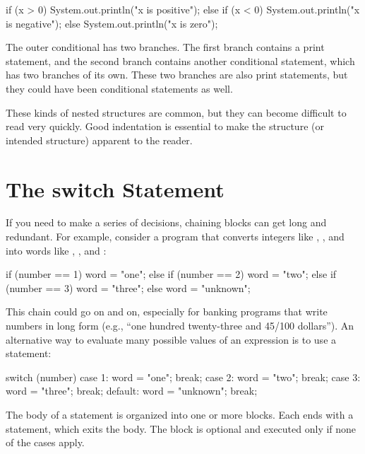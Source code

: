 \begin{code}
if (x > 0) {
    System.out.println("x is positive");
} else {
    if (x < 0) {
        System.out.println("x is negative");
    } else {
        System.out.println("x is zero");
    }
}
\end{code}

The outer conditional has two branches.
The first branch contains a print statement, and the second branch contains another conditional statement, which has two branches of its own.
These two branches are also print statements, but they could have been conditional statements as well.


These kinds of nested structures are common, but they can become difficult to read very quickly.
Good indentation is essential to make the structure (or intended structure) apparent to the reader.


\section{The switch Statement}

If you need to make a series of decisions, chaining  blocks can get long and redundant.
For example, consider a program that converts integers like , , and  into words like , , and :

\begin{code}
if (number == 1) {
    word = "one";
} else if (number == 2) {
    word = "two";
} else if (number == 3) {
    word = "three";
} else {
    word = "unknown";
}
\end{code}


This chain could go on and on, especially for banking programs that write numbers in long form (e.g., ``one hundred twenty-three and 45/100 dollars'').
An alternative way to evaluate many possible values of an expression is to use a  statement:

\begin{code}
switch (number) {
    case 1:
        word = "one";
        break;
    case 2:
        word = "two";
        break;
    case 3:
        word = "three";
        break;
    default:
        word = "unknown";
        break;
}
\end{code}

The body of a  statement is organized into one or more  blocks.
Each  ends with a  statement, which exits the  body.
The  block is optional and executed only if none of the cases apply.

